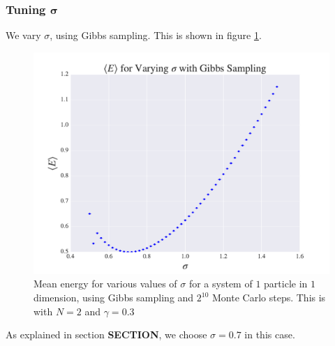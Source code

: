 \documentclass[a4paper, 10pt]{article}
\begin{document}
\subsubsection{Tuning $\boldsymbol{\sigma}$}
We vary $\sigma$, using Gibbs sampling. This is shown in figure \ref{fig:sigma_1d}.
\begin{figure}
	\centering
	\includegraphics[width=\textwidth]{../Results/varying_sigma_gibbs.pdf}
	\caption{Mean energy for various values of $\sigma$ for a system of $1$ particle in $1$ dimension, using Gibbs sampling and $2^{10}$ Monte Carlo steps. This is with $N=2$ and $\gamma=0.3$}\label{fig:sigma_1d}
\end{figure}
As explained in section \textbf{SECTION}, we choose $\sigma=0.7$ in this case.
\end{document}
